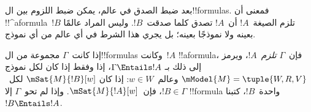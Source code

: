 \documentclass[../../../include/open-logic-section]{subfiles}
\begin{document}


\begin{explain}
  بعد ضبط الصدق في عالم، يمكن ضبط اللزوم بين ال!!{formula}s.
  فمعنى أن !!^a{formula}~$!B$ تلزم الصيغة~$!A$ أن~$!A$
  تصدق كلما صدقت~$!B$. وليس المراد عالمًا بعينه ولا نموذجًا بعينه؛
  بل يجري هذا الشرط في أي عالم من أي نموذج.
\end{explain}

\begin{defn}
  إذا كانت~$\Gamma$ مجموعة من ال!!{formula}s وكانت~$!A$ !!a{formula}،
  فإن~$\Gamma$ \emph{تلزم}~$!A$، ويرمز إلى ذلك بـ
  $\Gamma \Entails !A$، إذا وفقط إذا كان لكل نموذج
  $\mModel{M} = \tuple{W, R, V}$ وعالم~$w \in W$: إذا كان
  $\mSat{M}{!B}[w]$ لكل~$!B \in \Gamma$، فإن~$\mSat{M}{!A}[w]$.
  وإذا لم تحو~$\Gamma$ إلا !!{formula} واحدة~$!B$، كتبنا
  $!B \Entails !A$.
\end{defn}
\end{document}
